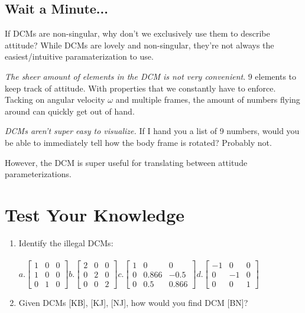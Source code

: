 \documentclass[a4paper,14pt]{extreport}
\begin{document}
\subsection{Wait a Minute...}
If DCMs are non-singular, why don't we exclusively use them to describe attitude? While DCMs are lovely and non-singular, they're not always the easiest/intuitive paramaterization to use. 


\emph{The sheer amount of elements in the DCM is not very convenient}. 9 elements to keep track of attitude. With properties that we constantly have to enforce. Tacking on angular velocity $\omega$ and multiple frames, the amount of numbers flying around can quickly get out of hand.

\emph{DCMs aren't super easy to visualize.} If I hand you a list of 9 numbers, would you be able to immediately tell how the body frame is rotated? Probably not.

However, the DCM is super useful for translating between attitude parameterizations.

\section{Test Your Knowledge}
\begin{enumerate}
\item Identify the illegal DCMs:\\\\
	$
	a.
	\begin{bmatrix}
			1&0&0\\
			1&0&0\\
			0&1&0
	\end{bmatrix} 
	b.	
	\begin{bmatrix}
			2&0&0\\
			0&2&0\\
			0&0&2
	\end{bmatrix}
	c.	
	\begin{bmatrix}
			1&0&0\\
			0&0.866&-0.5\\
			0&0.5&0.866
	\end{bmatrix}
	d.
	\begin{bmatrix}
			-1&0&0\\
			0&-1&0\\
			0&0&1
	\end{bmatrix}$ 
\item{Given DCMs [KB], [KJ], [NJ], how would you find DCM [BN]?}
\end{enumerate}
\end{document}
